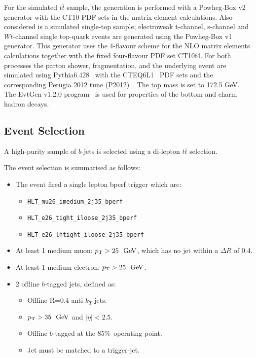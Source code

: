 For the simulated $t\bar{t}$ sample, the generation is performed with
a Powheg-Box v2~\cite{trig-powheg} generator with the CT10 PDF sets in the matrix element calculations.
Also considered is a simulated single-top sample;
electroweak t-channel, s-channel and $Wt$-channel single top-quark events are generated using the Powheg-Box v1 generator.
This generator uses the 4-flavour scheme for the NLO matrix elements calculations together with the fixed four-flavour PDF set CT10f4.
For both processes the parton shower, fragmentation, and the underlying event are simulated using Pythia6.428~\cite{trig-pythia6} with the CTEQ6L1~\cite{trig-CTEQ6L1} PDF sets
and the corresponding Perugia 2012 tune (P2012)~\cite{trig-perugia}.
The top mass is set to 172.5 GeV.
The EvtGen v1.2.0 program~\cite{trig-evtGen} is used for properties of the bottom and charm hadron decays. 
\newpage

\subsection{Event Selection}
\label{sec:trig-evtSel}

A high-purity sample of $b$-jets is selected using a di-lepton $t\bar{t}$ selection.

\noindent
The event selection is summarised as follows:

\begin{itemize}
\item The event fired a single lepton bperf trigger which are:
    \begin{itemize}[label={$-$}]
      \item\verb|HLT_mu26_imedium_2j35_bperf|
      \item\verb|HLT_e26_tight_iloose_2j35_bperf|
      \item\verb|HLT_e26_lhtight_iloose_2j35_bperf|
    \end{itemize}
\item At least 1 medium muon: $\pT>25~\GeV$, which has no jet within a $\Delta R$ of 0.4.
\item At least 1 medium electron: $\pT>25~\GeV$.
\item 2 offline $b$-tagged jets, defined as:
   \begin{itemize}[label={$-$}]
     \item Offline R=0.4 anti-$k_T$ jets.
     \item $\pT>35~\GeV$ and $|\eta|<2.5$.
     \item Offline $b$-tagged at the 85\%~operating point.
     \item Jet must be matched to a trigger-jet.
    \end{itemize}
\end{itemize}
\vspace{1em}


